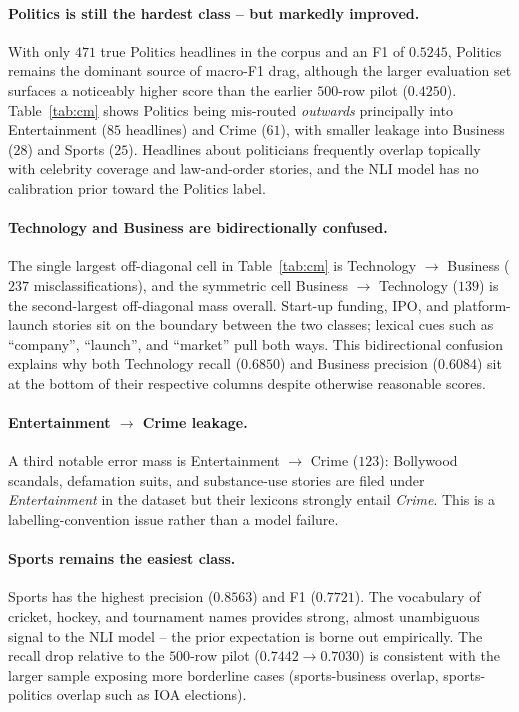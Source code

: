\documentclass[10pt,twocolumn,letterpaper]{article}
\begin{document}
\paragraph{Politics is still the hardest class -- but markedly improved.} With only $471$ true Politics headlines in the corpus and an F1 of $0.5245$, Politics remains the dominant source of macro-F1 drag, although the larger evaluation set surfaces a noticeably higher score than the earlier $500$-row pilot ($0.4250$). Table~\ref{tab:cm} shows Politics being mis-routed \emph{outwards} principally into Entertainment ($85$ headlines) and Crime ($61$), with smaller leakage into Business ($28$) and Sports ($25$). Headlines about politicians frequently overlap topically with celebrity coverage and law-and-order stories, and the NLI model has no calibration prior toward the Politics label.

\paragraph{Technology and Business are bidirectionally confused.} The single largest off-diagonal cell in Table~\ref{tab:cm} is Technology $\rightarrow$ Business ($237$ misclassifications), and the symmetric cell Business $\rightarrow$ Technology ($139$) is the second-largest off-diagonal mass overall. Start-up funding, IPO, and platform-launch stories sit on the boundary between the two classes; lexical cues such as ``company'', ``launch'', and ``market'' pull both ways. This bidirectional confusion explains why both Technology recall ($0.6850$) and Business precision ($0.6084$) sit at the bottom of their respective columns despite otherwise reasonable scores.

\paragraph{Entertainment $\rightarrow$ Crime leakage.} A third notable error mass is Entertainment $\rightarrow$ Crime ($123$): Bollywood scandals, defamation suits, and substance-use stories are filed under \textit{Entertainment} in the dataset but their lexicons strongly entail \textit{Crime}. This is a labelling-convention issue rather than a model failure.

\paragraph{Sports remains the easiest class.} Sports has the highest precision ($0.8563$) and F1 ($0.7721$). The vocabulary of cricket, hockey, and tournament names provides strong, almost unambiguous signal to the NLI model -- the prior expectation is borne out empirically. The recall drop relative to the $500$-row pilot ($0.7442 \rightarrow 0.7030$) is consistent with the larger sample exposing more borderline cases (sports-business overlap, sports-politics overlap such as IOA elections).
\end{document}
